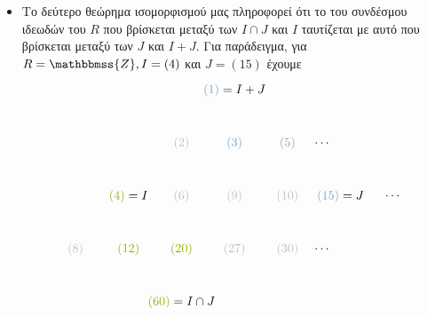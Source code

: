 \documentclass[12pt,a4paper,reqno]{amsart}
\makeatletter
\theoremstyle{definition}
\theoremstyle{remark}
\numberwithin{theorem}{section}
\numberwithin{exercise}{section}
\numberwithin{equation}{section}
\newcommand{\ZZ}{\mathbbmss{Z}}
\def\mathcolor#1#{\@mathcolor{#1}}
\def\@mathcolor#1#2#3{%
  \protect\leavevmode
  \begingroup
    \color#1{#2}#3%
  \endgroup
}
\makeatother
\begin{document}
\begin{itemize}
\[\begin{tikzpicture}
\begin{scope}[shift={(0,0)}]
        \draw[burntorange] (1)--(2)--(4);
        \draw[gray!50] (4) -- (8);
        \draw[burntorange] (1)--(3);
        \draw[gray!50] (1)--(5);
        \draw[burntorange] (2) -- (6) (3) -- (6);
        \draw[gray!50] (2) --(10);
        \draw[gray!50] (3) -- (9) -- (27) (3) -- (15);
        \draw[gray!50] (5) -- (10) (5) -- (15);
        \draw[burntorange] (4) -- (12);
        \draw[gray!50] (4) -- (20);
        \draw[burntorange] (6) -- (12);
        \draw[gray!50] (6) -- (30);
        \draw[gray!50] (10) -- (20) (10) -- (30);
        \draw[gray!50] (15) -- (30);
    \end{scope}
\end{tikzpicture}
\]

\item Το δεύτερο θεώρημα ισομορφισμού μας πληροφορεί ότι το  του συνδέσμου ιδεωδών του $R$ που βρίσκεται μεταξύ των $I\cap J$ και $Ι$ ταυτίζεται με αυτό που βρίσκεται μεταξύ των $J$ και $I+J$. Για παράδειγμα, για $R = \ZZ, I = (4)$ και $J = (15)$ έχουμε 
\[
\begin{tikzpicture}
    \begin{scope}[shift={(0,0)}]
        \node[gray!50] (8) at (0,0) {$(8)$};
        \node (4) at (1.5,1.5) {$\mathcolor{applegreen}{(4)} = I$};
        \node[gray!50] (2) at (3,3) {$(2)$};
        \node (1) at (4.5,4.5) {$\mathcolor{iceberg}{(1)} = I+J$};

        \node (12) at (1.5,0) {$\mathcolor{applegreen}{(12)}$};
        \node[gray!50] (6) at (3,1.5) {$(6)$};
        \node (3) at (4.5,3) {$\mathcolor{iceberg}{(3)}$};

        \node (20) at (3,0) {$\mathcolor{applegreen}{(20)}$};
        \node (60) at (3,-1.5) {$\mathcolor{applegreen}{(60)} = I\cap{J}$};
        \node[gray!50] (9) at (4.5,1.5) {$(9)$};

        \node[gray!50] (27) at (4.5,0) {$(27)$};

        \node[gray!50] (30) at (6,0) {$(30)$};
        \node[gray!50] (10) at (6,1.5) {$(10)$};
        \node (5) at (6,3) {$\mathcolor{iceberg}{(5)}$};

        \node (15) at (7.5,1.5) {$\mathcolor{iceberg}{(15)} = J$};

        \node (dots1) at (7,3) {$\cdots$};
        \node (dots2) at (9,1.5) {$\cdots$};
        \node (dots3) at (7,0) {$\cdots$};


\end{scope}
\end{tikzpicture}\]
\end{itemize}
\end{document}
